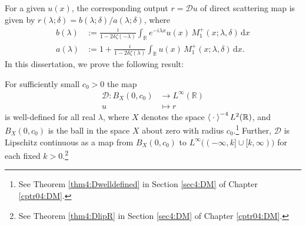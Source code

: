 \documentclass[../dissertation.tex]{subfiles}
\begin{document}
For a given 
$u(x)$, the corresponding output $r = \mathscr D u$ of direct scattering map is
given by $r(\lambda; \delta) = b(\lambda;\delta) / a(\lambda; \delta)$, where
\begin{align*}
	b(\lambda)
		&:= 
			\frac{i}{1-2\delta\zeta(-\lambda)} 
			\int_{\mathbb R} e^{-i\lambda x} 
				u(x) \, M_1^+(x; \lambda,\delta) 
			\, \mathrm{d}x
			\\
	a(\lambda)
		&:=
			1 
			+ \frac{i}{1-2\delta \zeta(\lambda)}
				\int_{\mathbb R} 
					u(x) \, M_1^+(x; \lambda,\delta) 
				\, \mathrm{d}x.
\end{align*}
In this dissertation, we prove the following result:
\begin{thm}\label{thm0:MainResult}
	For sufficiently small $c_0 > 0$ the map
	\begin{align*}
		\mathscr D : B_X(0, c_0) &\to L^\infty(\mathbb R) \\
		                       u &\mapsto r
	\end{align*}
	is well-defined for all real $\lambda$, where 
	$X$ denotes the space $\left\langle \kern 0.5ex \cdot \kern 0.5ex \right\rangle^{-4} L^2(\mathbb R)$, and 
	$B_X(0, c_0)$ \label{sym:ball} 
	is the ball in the 
	space $X$ about zero with radius $c_0$.\footnote{See Theorem \ref{thm4:Dwelldefined}
	in Section \ref{sec4:DM} of Chapter \ref{cptr04:DM}.}
	Further, $\mathscr D$ is 
	Lipschitz continuous as a map from $B_X(0, c_0)$ to 
	$L^\infty\big((-\infty, k]\cup[k, \infty)\big)$ for each fixed 
	$k>0$.\footnote{See Theorem \ref{thm4:DlipR} in Section \ref{sec4:DM} of Chapter 
	\ref{cptr04:DM}.}
\end{thm}
\end{document}
